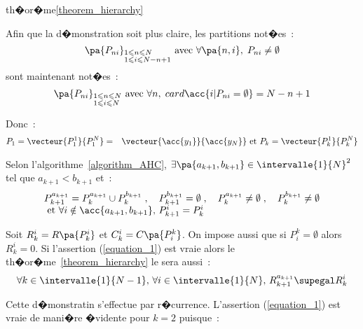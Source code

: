 \begin{xdemo}{th�or�me}{\ref{theorem_hierarchy}}

Afin que la d�monstration soit plus claire, les partitions not�es~:
    $$
    \pa{P_{ni}}_{  \begin{subarray}{l} 1 \leqslant n \leqslant N \\ 1 \leqslant i \leqslant N-n+1 \end{subarray}  }%
    \text{ avec } \forall \pa{n,i}, \; P_{ni} \neq \emptyset
    $$
sont maintenant not�es~:
    $$
    \pa{P_{ni}}_{\begin{subarray}{l} 1 \leqslant n \leqslant N \\ 1 \leqslant i \leqslant N \end{subarray}} %
    \text{ avec } \forall n, \; card \acc{ i | P_{ni} = \emptyset } = N-n+1
    $$

Donc~:
    \begin{eqnarray*}
    P_1 = \vecteur{P_1^1}{P_1^N}        &=&     \vecteur{\acc{y_1}}{\acc{y_N}} \text{ et }
    P_k                     =     \vecteur{P_k^1}{P_k^N}
    \end{eqnarray*}

Selon l'algorithme~\ref{algorithm_AHC}, $\exists \pa{a_{k+1},b_{k+1}} \in \intervalle{1}{N}^2$ tel que $a_{k+1}                 <         b_{k+1}$ et~:
        $$
    \begin{array}{l}
    P_{k+1}^{a_{k+1}}       =         P_{k}^{a_{k+1}} \cup P_{k}^{b_{k+1}} \; , \quad 
    P_{k+1}^{b_{k+1}}       =         \emptyset  \; , \quad  
    P_k^{a_{k+1}}           \neq      \emptyset  \; , \quad  
    P_k^{b_{k+1}}           \neq      \emptyset \\
    \text{ et } \forall i \notin \acc{a_{k+1},b_{k+1}}, \, P_{k+1}^{i} = P_k^i
    \end{array}
    $$

Soit $R_k^i = R \pa{P_k^i}$ et $C_k^i = C \pa{P^k_i}$. On impose aussi que si $P^k_i = \emptyset$ alors $R_k^i = 0$. Si l'assertion (\ref{equation_1}) est vraie alors le th�or�me~\ref{theorem_hierarchy} le sera aussi~:
    \begin{eqnarray}
    \forall k \in \intervalle{1}{N-1}, \, \forall i \in \intervalle{1}{N}, \, R_{k+1}^{a_{k+1}} \supegal R_{k}^i
    \label{equation_1}
    \end{eqnarray}

Cette d�monstratin s'effectue par r�currence. L'assertion (\ref{equation_1}) est vraie de mani�re �vidente pour $k=2$ puisque~:


\end{xdemo}
